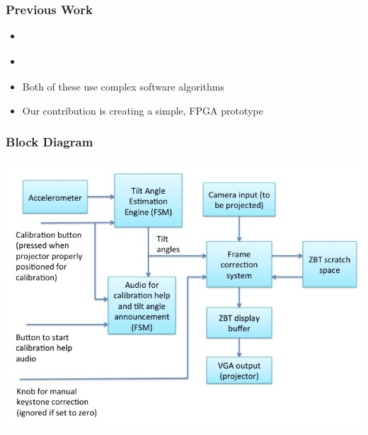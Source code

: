 \documentclass{beamer}
\begin{document}
\begin{frame}
\frametitle{Previous Work}
\begin{itemize}
\item \citet{raskar2001self}
\item \citet{sukthankar2001smarter}
\item Both of these use complex software algorithms
\pause
\item Our contribution is creating a simple, FPGA prototype
\end{itemize}
\end{frame}

\begin{frame}
\frametitle{Block Diagram}
\includegraphics[width=\textwidth]{./img/block_diag}
\end{frame}
\end{document}
